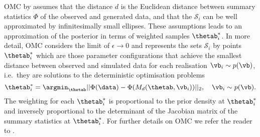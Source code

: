 OMC by \citet{Meeds2015} assumes that the distance $d$ is the
Euclidean distance between summary statistics $\Phi$ of the observed
and generated data, and that the $\mathcal{S}_i$ can be well
approximated by infinitesimally small ellipses. These assumptions
leads to an approximation of the posterior in terms of weighted
samples $\thetab_i^*$. In more detail, OMC considers the limit of
$\epsilon \to 0$ and represents the sets $\mathcal{S}_i$ by points
$\thetab_i^*$ which are those parameter configurations that achieve
the smallest distance between observed and simulated data for each
realisation $\vb_i \sim p(\vb)$, i.e.\ they are solutions to the
deterministic optimisation problems
\begin{equation} \label{eq:omc_opt_prob}
\thetab_i^* = \argmin_{\thetab} ||\Phi(\data)-\Phi(M_d(\thetab, \vb_i))||_2  , \quad \vb_i \sim p(\vb).
\end{equation}
The weighting for each $\thetab_i^*$ is proportional to the prior
density at $\thetab_i^*$ and inversely proportional to the determinant
of the Jacobian matrix of the summary statistics at $\thetab_i^*$. For
further details on OMC we refer the reader to \citep{Meeds2015,
Ikonomov2019}.

